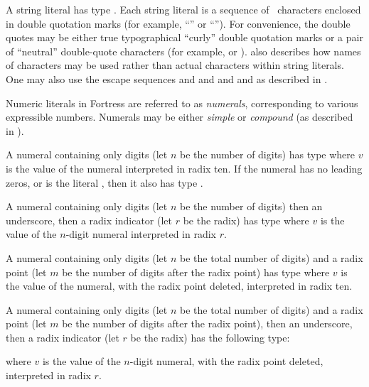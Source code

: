 A string literal has type .
Each string literal is a sequence of \unicode\ characters enclosed in double
quotation marks (for example,
``'' or ``'').
For convenience, the double quotes may be either true typographical ``curly'' double  quotation marks
or a pair of ``neutral'' double-quote characters (for example,
 or ).
 also describes how names of
characters may be used rather than actual characters within string literals.
One may also use the escape sequences  and 
and  and  and  as described in \cite{JLS}.


Numeric literals in Fortress are referred to as \emph{numerals},
corresponding to various expressible numbers.
Numerals may be either \emph{simple} or \emph{compound}
(as described in ).

A numeral containing only digits (let $n$ be the number of digits)
has type  where $v$ is the value of the numeral
interpreted in radix ten.  If the numeral has no leading zeros, or is
the literal , then it also has type .

A numeral containing only digits (let $n$ be the number of
digits) then an underscore, then a radix indicator (let $r$ be the
radix) has type 
where $v$ is
the value of the $n$-digit numeral interpreted in radix $r$.

A numeral containing only digits (let $n$ be the total number
of digits) and a radix point (let $m$ be the number of digits after
the radix point) has type
 where $v$ is
the value of the numeral, with the radix point deleted,
interpreted in radix ten.

A numeral containing only digits (let $n$ be the total number
of digits) and a radix point (let $m$ be the number of digits after
the radix point), then an underscore, then a radix indicator (let $r$
be the radix) has the following type:
\begin{Fortress}
\end{Fortress}
where $v$ is the value of the $n$-digit numeral, with the radix point
deleted, interpreted in radix $r$.


